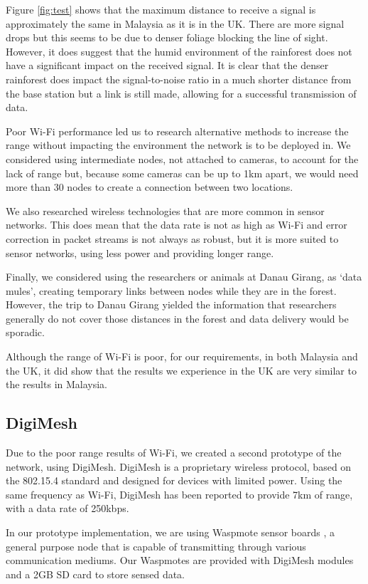 			Figure \ref{fig:test} shows that the maximum distance to receive a signal is approximately the same in Malaysia as it is in the UK.  There are more signal drops but this seems to be due to denser foliage blocking the line of sight. However, it does suggest that the humid environment of the rainforest does not have a significant impact on the received signal. It is clear that the denser rainforest does impact the signal-to-noise ratio in a much shorter distance from the base station but a link is still made, allowing for a successful transmission of data.
			
Poor Wi-Fi performance led us to research alternative methods to increase the range without impacting the environment the network is to be deployed in. We considered using intermediate nodes, not attached to cameras, to account for the lack of range but, because some cameras can be up to 1km apart, we would need more than 30 nodes to create a connection between two locations.
			
We also researched wireless technologies that are more common in sensor networks. This does mean that the data rate is not as high as Wi-Fi and error correction in packet streams is not always as robust, but it is more suited to sensor networks, using less power and providing longer range.
			
Finally, we considered using the researchers or animals at Danau Girang, as `data mules', creating temporary links between nodes while they are in the forest. However, the trip to Danau Girang yielded the information that researchers generally do not cover those distances in the forest and data delivery would be sporadic.
			
Although the range of Wi-Fi is poor, for our requirements, in both Malaysia and the UK, it did show that the results we experience in the UK are very similar to the results in Malaysia.

\subsection{DigiMesh}\label{tech:range:digimesh}
		Due to the poor range results of Wi-Fi, we created a second prototype of the network, using DigiMesh. DigiMesh is a proprietary wireless protocol, based on the 802.15.4 standard and designed for devices with limited power. Using the same frequency as Wi-Fi, DigiMesh has been reported to provide 7km of range, with a data rate of 250kbps.
		
In our prototype implementation, we are using Waspmote sensor boards \cite{waspmote}, a general purpose node that is capable of transmitting through various communication mediums. Our Waspmotes are provided with DigiMesh modules and a 2GB SD card to store sensed data.
		
